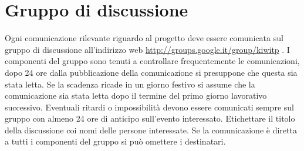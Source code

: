 \section{Gruppo di discussione}
Ogni comunicazione rilevante riguardo al progetto deve essere comunicata sul gruppo di discussione  all'indirizzo web \href{http://groups.google.it/group/kiwitp}{http://groups.google.it/group/kiwitp}  . I componenti del gruppo sono tenuti a controllare frequentemente le comunicazioni, dopo 24 ore dalla pubblicazione della comunicazione si presuppone che questa sia stata letta. Se la scadenza ricade in un giorno festivo si assume che la comunicazione sia stata letta dopo il termine del primo giorno lavorativo successivo. 
Eventuali ritardi o impossibilità devono essere comunicati sempre sul gruppo con almeno 24 ore di anticipo sull'evento interessato.
Etichettare il titolo della discussione coi nomi delle persone interessate. Se la comunicazione è diretta a tutti i componenti del gruppo si può omettere i destinatari.
